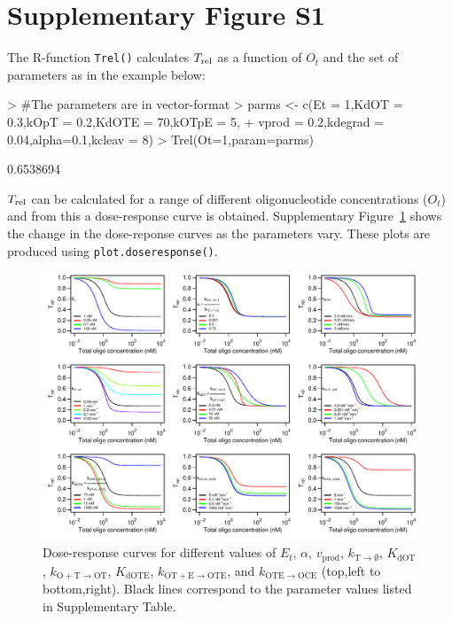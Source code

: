 \documentclass[a4paper,11pt]{article}
\newcommand{\kOpT}{k_{\mathrm{O+T \to OT}}}
\newcommand{\kt}{k_{\mathrm{OT+E \to OTE}}}
\newcommand{\kE}{k_{\mathrm{OTE \to OCE}}}
\newcommand{\vp}{v_{\mathrm{prod}}}
\newcommand{\vd}{k_{\mathrm{T \to \emptyset}}}
\newcommand{\Trel}{T_{\rm{rel}}}
\newcommand{\KdOT}{K_{\mathrm{dOT}}}
\newcommand{\KdOTE}{K_{\mathrm{dOTE}}}
\begin{document}
\section{Supplementary Figure S1}
The R-function \texttt{Trel()} calculates $\Trel$ as a function of $O_t$ and the set of parameters as in the example below:
\begin{Schunk}
\begin{Sinput}
> #The parameters are in vector-format
> parms <- c(Et = 1,KdOT = 0.3,kOpT = 0.2,KdOTE = 70,kOTpE = 5,	
+            vprod = 0.2,kdegrad = 0.04,alpha=0.1,kcleav = 8)
> Trel(Ot=1,param=parms)
\end{Sinput}
\begin{Soutput}
[1] 0.6538694
\end{Soutput}
\end{Schunk}
$\Trel$ can be calculated for a range of different oligonucleotide concentrations ($O_t$) and from this a dose-response curve is obtained. Supplementary Figure~\ref{fig::Etot} shows the change in the dose-reponse curves as the parameters vary. These plots are produced using \texttt{plot.doseresponse()}.
\begin{figure}[!b]
\includegraphics[width=\textwidth]{SuppFile1-S1.pdf}
\caption{Dose-response curves for different values of $E_{t}$, $\alpha$, $\vp$, $\vd$, $\KdOT$, $\kOpT$, $\KdOTE$, $\kt$, and $\kE$ (top,left to bottom,right). Black lines correspond to the parameter values listed in Supplementary Table.}\label{fig::Etot}
\end{figure}

\end{document}
